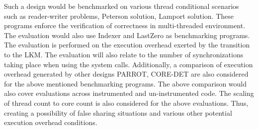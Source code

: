 \documentclass[12pt]{article}
\begin{document}
Such a design would be benchmarked on various thread conditional scenarios such as reader-writer problems, Peterson solution, Lamport solution. 
These programs enforce the verification of correctness in multi-threaded environment. 
The evaluation would also use Indexer and LastZero as benchmarking programs. 
The evaluation is performed on the execution overhead exerted by the transition to the LKM. 
The evaluation will also relate to the number of synchronizations taking place when using the system calls. 
Additionally, a comparison of execution overhead generated by other designs PARROT, CORE-DET are also considered for the above mentioned benchmarking programs. 
The above comparison would also cover evaluations across instrumented and un-instrumented code. 
The scaling of thread count to core count is also considered for the above evaluations.
Thus, creating a possibility of false sharing situations and various other potential execution overhead conditions. 
\end{document}
